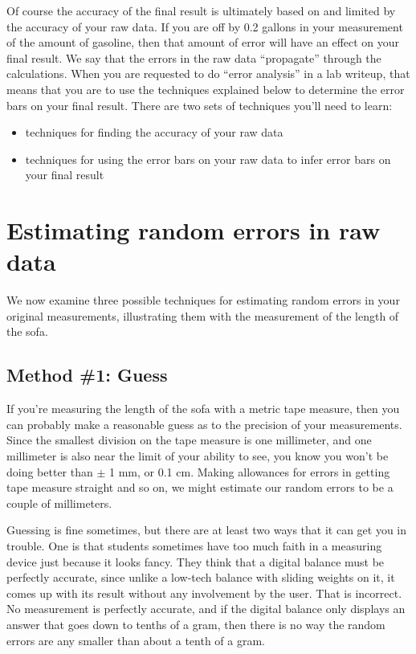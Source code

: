 	Of course the accuracy of the final result is ultimately
based on and limited by the accuracy of your raw data. If
you are off by 0.2 gallons in your measurement of the amount
of gasoline, then that amount of error will have an effect
on your final result. We say that the errors in the raw data
``propagate'' through the calculations. When you are
requested to do ``error analysis'' in a lab writeup, that
means that you are to use the techniques explained below to
determine the error bars on your final result. There are two
sets of techniques you'll need to learn:

\begin{itemize}
\item[] techniques for finding the accuracy of your raw data

\item[] techniques for using the error bars on your raw data to
infer error bars on your final result
\end{itemize}

\section*{Estimating random errors in raw data}

	We now examine three possible techniques for estimating
random errors in your original measurements, illustrating
them with the measurement of the length of the sofa.

\subsection*{Method \#1: Guess}

	If you're measuring the length of the sofa with a metric
tape measure, then you can probably make a reasonable guess
as to the precision of your measurements. Since the smallest
division on the tape measure is one millimeter, and one
millimeter is also near the limit of your ability to see,
you know you won't be doing better than $\pm$ 1 mm, or 0.1 cm.
Making allowances for errors in getting tape measure
straight and so on, we might estimate our random errors to
be a couple of millimeters.

	Guessing is fine sometimes, but there are at least two ways
that it can get you in trouble. One is that students
sometimes have too much faith in a measuring device just
because it looks fancy. They think that a digital balance
must be perfectly accurate, since unlike a low-tech balance
with sliding weights on it, it comes up with its result
without any involvement by the user. That is incorrect. No
measurement is perfectly accurate, and if the digital
balance only displays an answer that goes down to tenths of
a gram, then there is no way the random errors are any
smaller than about a tenth of a gram.

